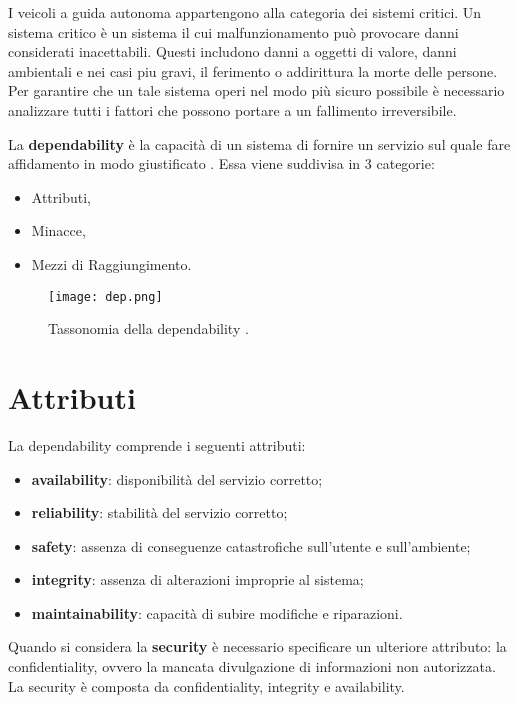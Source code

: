 I veicoli a guida autonoma appartengono alla categoria dei sistemi critici. Un sistema critico è un sistema il cui malfunzionamento può provocare danni
considerati inacettabili. Questi includono danni a oggetti di valore, danni ambientali e nei casi piu gravi, il ferimento o addirittura la morte delle persone.
Per garantire che un tale sistema operi nel modo più sicuro possibile è necessario analizzare tutti i fattori che possono portare a  un fallimento irreversibile.

La \textbf{dependability} è la capacità di un sistema di fornire un servizio sul quale fare affidamento in modo giustificato \cite{tax}.
Essa viene suddivisa in 3 categorie:
\begin{itemize}
    \item Attributi,
    \item Minacce,
    \item Mezzi di Raggiungimento.
\end{itemize}
\begin{figure}[h]
    \texttt{[image: dep.png]}
    \caption{Tassonomia  della dependability \cite{dep}.}
    \label{fig:dep}
\end{figure}
\section{Attributi}
La dependability comprende i seguenti attributi:
\begin{itemize}
    \item \textbf{availability}: disponibilità del servizio corretto;
    \item \textbf{reliability}: stabilità del servizio corretto;
    \item \textbf{safety}: assenza di conseguenze catastrofiche sull'utente e sull'ambiente;
    \item \textbf{integrity}: assenza di alterazioni improprie al sistema;
    \item \textbf{maintainability}: capacità di subire modifiche e riparazioni.
\end{itemize}
Quando si considera la \textbf{security} è necessario specificare un ulteriore attributo: la confidentiality, ovvero la mancata divulgazione di informazioni non 
autorizzata. La security è composta da confidentiality, integrity e availability.
